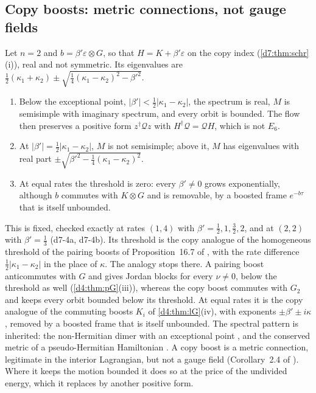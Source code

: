 \subsection{Copy boosts: metric connections, not gauge fields}
\label{d7:sec:boost}

\begin{proposition}
\label{d7:prop:boost}
Let $n=2$ and $b=\beta'\varepsilon\otimes G$, so that $H=K+\beta'\varepsilon$ on the copy index (\cref{d7:thm:schr}(i)), real and not symmetric. Its eigenvalues are
$\tfrac12(\kappa_1+\kappa_2)\pm\sqrt{\tfrac14(\kappa_1-\kappa_2)^2-\beta'^2}$.
\begin{enumerate}[label=(\roman*),leftmargin=2.2em]
\item Below the exceptional point, $|\beta'|<\tfrac12|\kappa_1-\kappa_2|$, the spectrum is real, $M$ is semisimple with imaginary spectrum, and every orbit
is bounded. The flow then preserves a positive form $z^\dagger\mathcal Qz$ with $H^\dagger\mathcal Q=\mathcal QH$, which is not $E_6$.
\item At $|\beta'|=\tfrac12|\kappa_1-\kappa_2|$, $M$ is not semisimple; above it, $M$ has eigenvalues with real part $\pm\sqrt{\beta'^2-\tfrac14(\kappa_1-\kappa_2)^2}$.
\item At equal rates the threshold is zero: every $\beta'\neq0$ grows exponentially, although $b$ commutes with $K\otimes G$ and is removable, by a
boosted frame $e^{-b\tau}$ that is itself unbounded.
\end{enumerate}
\end{proposition}

This is fixed, checked exactly at rates $(1,4)$ with $\beta'=\tfrac12,1,\tfrac32,2$, and at $(2,2)$ with $\beta'=\tfrac13$ (d7-4a, d7-4b). Its threshold is the
copy analogue of the homogeneous threshold of the pairing boosts of Proposition~16.7 of \cite{ES17}, with the rate difference
$\tfrac12|\kappa_1-\kappa_2|$ in the place of $\kappa$. The analogy stops there. A pairing boost anticommutes with $G$ and gives Jordan blocks for
every $\nu\neq0$, below the threshold as well (\cref{d4:thm:pG}(iii)), whereas the copy boost commutes with $G_2$ and keeps every orbit bounded
below its threshold. At equal rates it is the copy analogue of the commuting boosts $K_i$ of \cref{d4:thm:lG}(iv), with exponents
$\pm\beta'\pm i\kappa$, removed by a boosted frame that is itself unbounded. The spectral pattern is inherited: the
non-Hermitian dimer with an exceptional point \cite{Kato66,BenderBoettcher98}, and the conserved metric of a pseudo-Hermitian Hamiltonian
\cite{Mostafazadeh02}. A copy boost is a metric connection, legitimate in the interior Lagrangian, but not a gauge field (Corollary~2.4 of
\cite{ES17}). Where it keeps the motion bounded it does so at the price of the undivided energy, which it replaces by another positive form.

